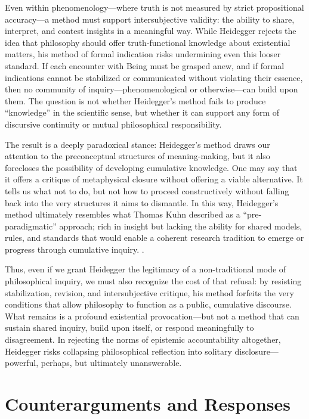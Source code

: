 \documentclass{article}
\begin{document}
Even within phenomenology—where truth is not measured by strict propositional accuracy—a method must support intersubjective validity: the ability to share, interpret, and contest insights in a meaningful way. While Heidegger rejects the idea that philosophy should offer truth-functional knowledge about existential matters, his method of formal indication risks undermining even this looser standard. If each encounter with Being must be grasped anew, and if formal indications cannot be stabilized or communicated without violating their essence, then no community of inquiry—phenomenological or otherwise—can build upon them. The question is not whether Heidegger’s method fails to produce “knowledge” in the scientific sense, but whether it can support any form of discursive continuity or mutual philosophical responsibility.

The result is a deeply paradoxical stance: Heidegger's method draws our attention to the preconceptual structures of meaning-making, but it also forecloses the possibility of developing cumulative knowledge. One may say that it offers a critique of metaphysical closure without offering a viable alternative. It tells us what not to do, but not how to proceed constructively without falling back into the very structures it aims to dismantle. In this way, Heidegger’s method ultimately resembles what Thomas Kuhn described as a “pre-paradigmatic” approach; rich in insight but lacking the ability for shared models, rules, and standards that would enable a coherent research tradition to emerge or progress through cumulative inquiry. \parencite[pp.~10-11]{kuhn1996}.

Thus, even if we grant Heidegger the legitimacy of a non-traditional mode of philosophical inquiry, we must also recognize the cost of that refusal: by resisting stabilization, revision, and intersubjective critique, his method forfeits the very conditions that allow philosophy to function as a public, cumulative discourse. What remains is a profound existential provocation—but not a method that can sustain shared inquiry, build upon itself, or respond meaningfully to disagreement. In rejecting the norms of epistemic accountability altogether, Heidegger risks collapsing philosophical reflection into solitary disclosure—powerful, perhaps, but ultimately unanswerable.

\section*{Counterarguments and Responses}
\end{document}
